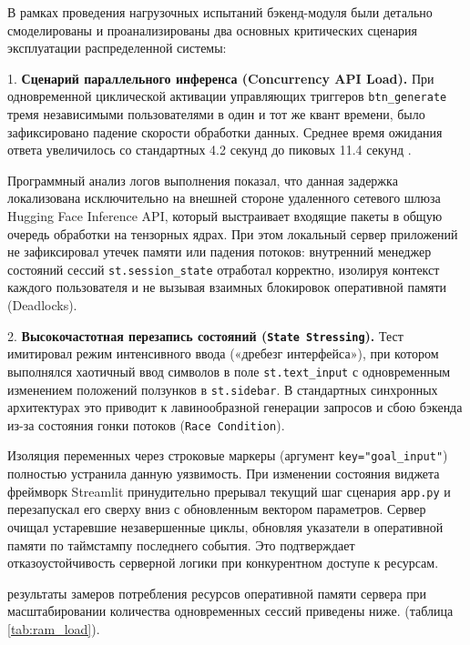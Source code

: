 \documentclass[14pt, a4paper]{extarticle}
\begin{document}
В рамках проведения нагрузочных испытаний бэкенд-модуля были детально смоделированы и проанализированы два основных критических сценария эксплуатации распределенной системы:

1. \textbf{Сценарий параллельного инференса (Concurrency API Load).} При одновременной циклической активации управляющих триггеров \texttt{btn\_generate} тремя независимыми пользователями в один и тот же квант времени, было зафиксировано падение скорости обработки данных. Среднее время ожидания ответа увеличилось со стандартных 4.2 секунд до пиковых 11.4 секунд \cite{app.py}. 

Программный анализ логов выполнения показал, что данная задержка локализована исключительно на внешней стороне удаленного сетевого шлюза Hugging Face Inference API, который выстраивает входящие пакеты в общую очередь обработки на тензорных ядрах. При этом локальный сервер приложений не зафиксировал утечек памяти или падения потоков: внутренний менеджер состояний сессий \texttt{st.session\_state} отработал корректно, изолируя контекст каждого пользователя и не вызывая взаимных блокировок оперативной памяти (Deadlocks).

2. \textbf{Высокочастотная перезапись состояний (\texttt{State Stressing}).} Тест имитировал режим интенсивного ввода («дребезг интерфейса»), при котором выполнялся хаотичный ввод символов в поле \texttt{st.text\_input} с одновременным изменением положений ползунков в \texttt{st.sidebar}. В стандартных синхронных архитектурах это приводит к лавинообразной генерации запросов и сбою бэкенда из-за состояния гонки потоков (\texttt{Race Condition}). 

Изоляция переменных через строковые маркеры (аргумент \texttt{key="goal\_input"}) полностью устранила данную уязвимость. При изменении состояния виджета фреймворк Streamlit принудительно прерывал текущий шаг сценария \texttt{app.py} и перезапускал его сверху вниз с обновленным вектором параметров. Сервер очищал устаревшие незавершенные циклы, обновляя указатели в оперативной памяти по таймстампу последнего события. Это подтверждает отказоустойчивость серверной логики при конкурентном доступе к ресурсам.

результаты замеров потребления ресурсов оперативной памяти сервера при масштабировании количества одновременных сессий приведены ниже. (таблица \ref{tab:ram_load}).
\end{document}
